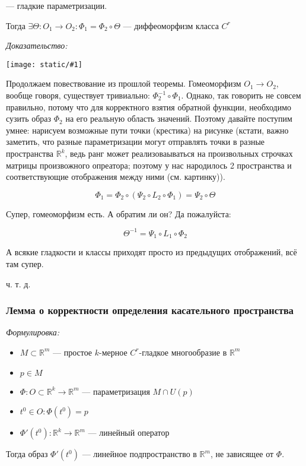 \documentclass{article}
\def\image#1{\texttt{[image: static/\#1]}}
\begin{document}
--- гладкие параметризации.

Тогда $\exists \Theta: O_1 \rightarrow O_2: \Phi_1 = \Phi_2 \circ \Theta$ --- диффеоморфизм класса $C^r$

\textit{Доказательство:}

\image{sl_o_2_param.png}

Продолжаем повествование из прошлой теоремы. Гомеоморфизм $O_1 \rightarrow O_2$, вообще говоря, существует тривиально: $\Phi_2^{-1} \circ \Phi_1$. Однако, так говорить не совсем правильно, потому что для корректного взятия обратной функции, необходимо сузить образ $\Phi_2$ на его реальную область значений. Поэтому давайте поступим умнее: нарисуем возможные пути точки (крестика) на рисунке (кстати, важно заметить, что разные параметризации могут отправлять точки в разные пространства $\mathbb{R}^k$, ведь ранг может реализоваываться на произвольных строчках матрицы произвожного опреатора; поэтому у нас народилось 2 пространства и соответствующие отображения между ними (см. картинку)).

\[\Phi_1 = \Phi_2 \circ (\Psi_2 \circ L_2 \circ \Phi_1) = \Psi_2 \circ \Theta\]

Супер, гомеоморфизм есть. А обратим ли он? Да пожалуйста:

\[\Theta^{-1} = \Psi_1 \circ L_1 \circ \Phi_2\]

А всякие гладкости и классы приходят просто из предыдущих отображений, всё там супер.

ч. т. д.

\subsubsection{Лемма о корректности определения касательного пространства}
\textit{Формулировка:}

\begin{itemize}
    \item $M \subset \mathbb{R}^m$ --- простое $k$-мерное $C^r$-гладкое многообразие в $\mathbb{R}^m$
    \item $p \in M$
    \item $\Phi: O \subset \mathbb{R}^k \rightarrow \mathbb{R}^m$ --- параметризация $M \cap U(p)$
    \item $t^0 \in O: \Phi(t^0) = p$
    \item $\Phi'(t^0): \mathbb{R}^k \rightarrow \mathbb{R}^m$ --- линейный оператор
\end{itemize}

Тогда образ $\Phi'(t^0)$ --- линейное подпространство в $\mathbb{R}^m$, не зависящее от $\Phi$.
\end{document}
